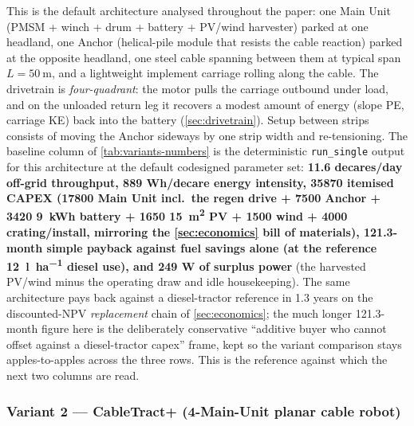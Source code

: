 \documentclass[11pt,a4paper]{article}
\begin{document}
This is the default architecture analysed throughout the paper: one Main Unit (PMSM + winch + drum + battery + PV/wind harvester) parked at one headland, one Anchor (helical-pile module that resists the cable reaction) parked at the opposite headland, one steel cable spanning between them at typical span $L = \SI{50}{\meter}$, and a lightweight implement carriage rolling along the cable. The drivetrain is \emph{four-quadrant}: the motor pulls the carriage outbound under load, and on the unloaded return leg it recovers a modest amount of energy (slope PE, carriage KE) back into the battery (\cref{sec:drivetrain}). Setup between strips consists of moving the Anchor sideways by one strip width and re-tensioning. The baseline column of \cref{tab:variants-numbers} is the deterministic \texttt{run\_single} output for this architecture at the default codesigned parameter set: \textbf{11.6 decares/day off-grid throughput, 889 Wh/decare energy intensity, \SI{35870}{\EUR} itemised CAPEX (\SI{17800}{\EUR} Main Unit incl.\ the regen drive + \SI{7500}{\EUR} Anchor + \SI{3420}{\EUR} \SI{9}{\kWh} battery + \SI{1650}{\EUR} \SI{15}{\meter\squared} PV + \SI{1500}{\EUR} wind + \SI{4000}{\EUR} crating/install, mirroring the \cref{sec:economics} bill of materials), 121.3-month simple payback against fuel savings alone (at the reference \SI{12}{\litre\per\hectare} diesel use), and 249 W of surplus power} (the harvested PV/wind minus the operating draw and idle housekeeping). The same architecture pays back against a diesel-tractor reference in 1.3 years on the discounted-NPV \emph{replacement} chain of \cref{sec:economics}; the much longer 121.3-month figure here is the deliberately conservative ``additive buyer who cannot offset against a diesel-tractor capex'' frame, kept so the variant comparison stays apples-to-apples across the three rows. This is the reference against which the next two columns are read.

\subsubsection{Variant 2 --- CableTract+ (4-Main-Unit planar cable robot)}\label{sec:variant-plus}
\end{document}
